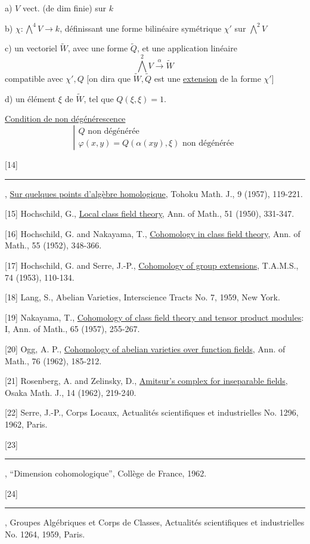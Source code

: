 a) $V$ vect. (de dim finie) sur $k$


b) $\chi:\bigwedge^4V\longrightarrow k$, définissant une forme bilinéaire symétrique $\chi'$ sur $\bigwedge^2V$

c) un vectoriel $\widetilde W$, avec une forme  $\widetilde Q$, et une application linéaire
\[
\bigwedge^2V\xrightarrow{\alpha}\widetilde W
\]
compatible avec $\chi',Q$ [on dira que $\widetilde W,\widetilde Q$ est une \uline{extension} de la forme $\chi'$]

d) un élément $\xi$ de $\widetilde W$, tel que $Q(\xi,\xi)=1$.

\uline{Condition de non dégénérescence}
\[
\left|\begin{array}{l}
Q\text{ non dégénérée}\\
\varphi(x,y)=Q(\alpha(xy),\xi)\text{ non dégénérée}
\end{array}\right.
\]

[14] \rule{2cm}{0.4pt}, \uline{Sur quelques points d'algèbre homologique}, Tohoku Math. J., 9 (1957), 119-221.

[15] Hochschild, G., \uline{Local class field theory}, Ann. of Math., 51 (1950), 331-347.

[16] Hochschild, G. and Nakayama, T., \uline{Cohomology in class field theory}, Ann. of Math., 55 (1952), 348-366.

[17] Hochschild, G. and Serre, J.-P., \uline{Cohomology of group extensions}, T.A.M.S., 74 (1953), 110-134.

[18] Lang, S., Abelian Varieties, Interscience Tracts No. 7, 1959, New York.

[19] Nakayama, T., \uline{Cohomology of class field theory and tensor product modules}: I, Ann. of Math., 65 (1957), 255-267.

[20] Ogg, A. P., \uline{Cohomology of abelian varieties over function fields}, Ann. of Math., 76 (1962), 185-212.

[21] Rosenberg, A. and Zelinsky, D., \uline{Amitsur's complex for inseparable fields}, Osaka Math. J., 14 (1962), 219-240.

[22] Serre, J.-P., Corps Locaux, Actualités scientifiques et industrielles No. 1296, 1962, Paris.

[23] \rule{2cm}{0.4pt}, ``Dimension cohomologique'',  Collège de France, 1962.

[24] \rule{2cm}{0.4pt}, Groupes Algébriques et Corps de Classes, Actualités scientifiques et industrielles No. 1264, 1959, Paris.

